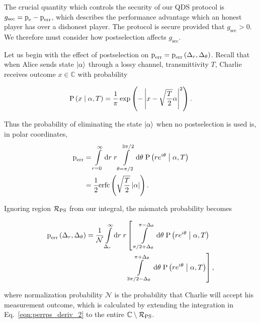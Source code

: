 The crucial quantity which controls the security of our QDS protocol is $g_{\text{sec}} = \text{p}_{\text{e}} - \text{p}_{\text{err}}$, which describes the performance advantage which an honest player has over a dishonest player. The protocol is secure provided that $g_{\text{sec}} > 0$. We therefore must consider how postselection affects $g_{\text{sec}}$. 

Let us begin with the effect of postselection on $\text{p}_{\text{err}} = \text{p}_{\text{err}}\left(\Delta_r, \Delta_\theta\right)$.  Recall that when Alice sends state $\ket{\alpha}$ through a lossy channel, transmittivity $T$, Charlie receives outcome $x \in \mathbb{C}$ with probability

\begin{equation}
\text{P}\left(x \; \middle| \; \alpha, T\right) = \frac{1}{\pi} \exp\left( - \left| x - \sqrt{\frac{T}{2}}\alpha\right|^2\right).
\end{equation}

\noindent Thus the probability of eliminating the state $\ket{\alpha}$ when no postselection is used is, in polar coordinates,
\begin{align}
\perr &= \int\limits_{r=0}^\infty \mathrm{d}r \; r \int\limits_{\theta = \pi/2}^{3 \pi/2} \mathrm{d}\theta \; \text{P}\left(r e^{i \theta} \given \alpha, T\right) \notag \\
%
&= \frac{1}{2}\erfc\left(\sqrt{\frac{T}{2}}\left|\alpha\right|\right).
\end{align}

\noindent Ignoring region $\mathcal{R}_{\text{PS}}$ from our integral, the mismatch probability becomes

\begin{align}\label{eqn:perrps_deriv_2}
\perr\left(\Delta_r, \Delta_\theta\right) = \frac{1}{\mathcal{N}} \int\limits_{\Delta_r}^{\infty} \mathrm{d}r \; r &\left[ \; \int\limits_{ \pi/2 + \Delta_\theta}^{\pi - \Delta_\theta} \mathrm{d}\theta \; \text{P}\left(r e^{i \theta} \given \alpha, T\right) \right. \notag \\
%
&\left. \int\limits_{3 \pi/2 - \Delta_\theta}^{\pi + \Delta_\theta} \mathrm{d}\theta \; \text{P}\left(r e^{i \theta} \given \alpha, T\right) \right],
\end{align}

\noindent where normalization probability $\mathcal{N}$ is the probability that Charlie will accept his measurement outcome, which is calculated by extending the integration in Eq.~\ref{eqn:perrps_deriv_2} to the entire $\mathbb{C} \setminus \mathcal{R}_{\text{PS}}$.

